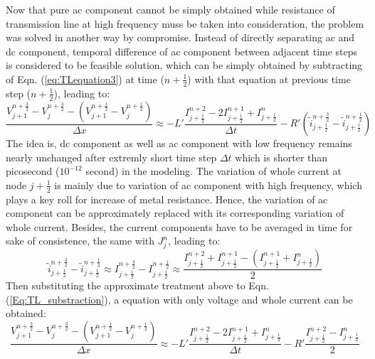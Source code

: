 \documentclass[11pt,final]{scrbook}
\begin{document}
Now that pure ac component cannot be simply obtained while resistance of transmission line at high frequency muss be taken into consideration, the problem was solved in another way by compromise. Instead of directly separating ac and dc component, temporal difference of ac component between adjacent time steps is considered to be feasible solution, which can be simply obtained by subtracting of Eqn. (\ref{eq:TLequation3}) at time ($n+\frac{1}{2}$) with that equation at previous time step ($n+\frac{1}{2}$), leading to:
\begin{equation}
\frac { { V }_{ j+1 }^{ n+\frac{3}{2} }-{ V }_{ j }^{ n+\frac{3}{2}}-({ V }_{ j+1 }^{ n+\frac{1}{2} }-{ V }_{ j }^{ n+\frac{1}{2} }) }{ \Delta x } \approx -L'\frac { { I }_{ j+\frac{1}{2} }^{ n+2 }-2{ I }_{ j+\frac{1}{2} }^{ n+1 }+{ I }_{ j+\frac{1}{2} }^{ n } }{ \Delta t } -R' (\widetilde{ i } _{ j+\frac{1}{2} }^{ n+\frac{3}{2} }-\widetilde{ i } _{ j+\frac{1}{2} }^{ n+\frac{1}{2} })\label{Eq:TL_substraction}
\end{equation}
The idea is, dc component as well as ac component with low frequency remains nearly unchanged after extremly short time step $\Delta t$ which is shorter than picosecond ($10^{-12}$ second) in the modeling. The variation of whole current at node $j+\frac{1}{2}$ is mainly due to variation of ac component with high frequency, which plays a key roll for increase of metal resistance. Hence, the variation of ac component can be approximately replaced with its corresponding variation of whole current. Besides, the current components have to be averaged in time for sake of consistence, the same with $J_{j}^{n}$, leading to:
\begin{equation}
\tilde{ i }_{ j+\frac { 1 }{ 2 }  }^{ n+\frac{3}{2} }-\tilde{ i }_{ j+\frac { 1 }{ 2 }  }^{ n+\frac{1}{2} }\approx{ I }_{ j+\frac { 1 }{ 2 }  }^{ n+\frac{3}{2} }-{ I }_{ j+\frac { 1 }{ 2 }  }^{ n+\frac{1}{2} } \approx \frac{{ I }_{ j+\frac { 1 }{ 2 }  }^{ n+2 }+{ I }_{ j+\frac { 1 }{ 2 }  }^{ n+1 }-({ I }_{ j+\frac { 1 }{ 2 }  }^{ n+1 }+{ I }_{ j+\frac { 1 }{ 2 }  }^{ n })}{2}\label{Eq:ac_Current}
\end{equation}
Then substituting the approximate treatment above to Eqn. (\ref{Eq:TL_substraction}),  a equation with only voltage and whole current can be obtained:
\begin{equation}
\frac { { V }_{ j+1 }^{ n+\frac{3}{2} }-{ V }_{ j }^{ n+\frac{3}{2}}-({ V }_{ j+1 }^{ n+\frac{1}{2} }-{ V }_{ j }^{ n+\frac{1}{2} }) }{ \Delta x } \approx -L'\frac { { I }_{ j+\frac{1}{2} }^{ n+2 }-2{ I }_{ j+\frac{1}{2} }^{ n+1 }+{ I }_{ j+\frac{1}{2} }^{ n } }{ \Delta t } -R' \frac{{ I }_{ j+\frac { 1 }{ 2 }  }^{ n+2 }-{ I }_{ j+\frac { 1 }{ 2 }  }^{ n }}{2}
\end{equation}
\end{document}
